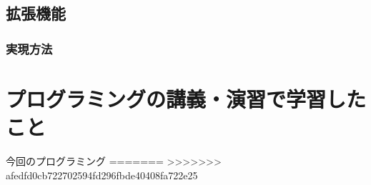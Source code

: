 \documentclass[dvipdfmx]{jarticle}
\begin{document}
\subsection{拡張機能}


\subsubsection{実現方法}


\section{プログラミングの講義・演習で学習したこと}
今回のプログラミング
=======
>>>>>>> afedfd0cb722702594fd296fbde40408fa722e25
\end{document}
